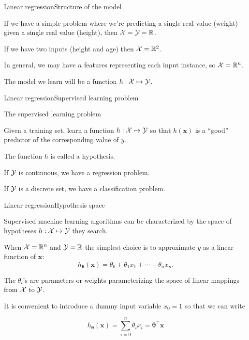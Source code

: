 \documentclass{beamer}
\renewcommand{\vec}[1]{\boldsymbol{#1}}
\def\Rset{\mathbb{R}}
\begin{document}
\begin{frame}{Linear regression}{Structure of the model}

  If we have a simple problem where we're predicting a single real
  value (weight) given a single real value (height), then ${\cal X} =
  {\cal Y} = \Rset$.

  \medskip

  If we have two inputs (height and age) then ${\cal X} = \Rset^2$.

  \medskip

  In general, we may have $n$ features representing each input instance,
  so ${\cal X} = \Rset^n$.

  \medskip

  The model we learn will be a function $h : {\cal X} \mapsto {\cal Y}$.
  
\end{frame}


\begin{frame}{Linear regression}{Supervised learning problem}

  \begin{block}{The supervised learning problem}

    Given a training set, learn a function $h : {\cal X} \mapsto {\cal Y}$
    so that $h(\vec{x})$ is a ``good'' predictor of the corresponding value
    of $y$.
    
  \end{block}

  \medskip

  The function $h$ is called a \alert{hypothesis}.

  \medskip

  If $\cal Y$ is continuous, we have a \alert{regression} problem.

  \medskip

  If $\cal Y$ is a discrete set, we have a \alert{classification}
  problem.

\end{frame}


\begin{frame}{Linear regression}{Hypothesis space}

  Supervised machine learning algorithms can be characterized by the
  space of hypotheses $h : {\cal X} \mapsto {\cal Y}$ they search.

  \medskip

  When ${\cal X} = \Rset^n$ and ${\cal Y} = \Rset$ the simplest choice
  is to approximate $y$ as a linear function of $\vec{x}$:
  \[ h_{\vec{\theta}}(\vec{x}) = \theta_0 + \theta_1 x_1 + \cdots + \theta_n x_n .\]

  \medskip

  The $\theta_i$'s are \alert{parameters} or \alert{weights}
  parameterizing the space of linear mappings from $\cal X$ to $\cal
  Y$.

  \medskip

  It is convenient to introduce a dummy input variable $x_0=1$ so that
  we can write

  \[ h_{\vec{\theta}}(\vec{x}) = \sum_{i=0}^n \theta_i x_i = \vec{\theta}^\top \vec{x} \]
  
\end{frame}
\end{document}
